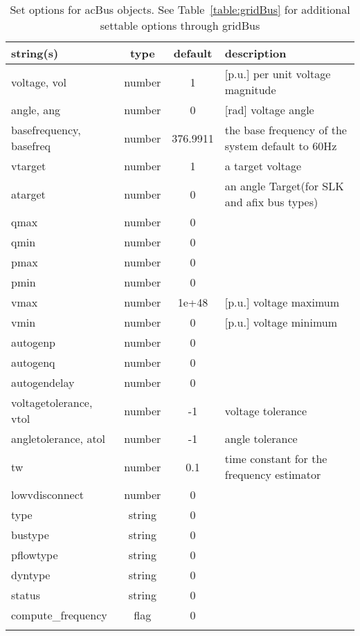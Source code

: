 \begin{longtable}{p{5cm} c c p{7cm}}
string(s) & type & default & description \\
\hline
voltage, vol & number & 1 & [p.u.]    per unit voltage magnitude\\
angle, ang & number & 0 & [rad]     voltage angle\\
basefrequency, basefreq & number & 376.9911 & the base frequency of the system default to 60Hz\\
vtarget & number & 1 & a target voltage\\
atarget & number & 0 & an angle Target(for SLK and afix bus types)\\
qmax & number & 0 & \\
qmin & number & 0 & \\
pmax & number & 0 & \\
pmin & number & 0 & \\
vmax & number & 1e+48 & [p.u.]    voltage maximum\\
vmin & number & 0 & [p.u.]    voltage minimum\\
autogenp & number & 0 & \\
autogenq & number & 0 & \\
autogendelay & number & 0 & \\
voltagetolerance, vtol & number & -1 & voltage tolerance\\
angletolerance, atol & number & -1 & angle tolerance\\
tw & number & 0.1 & time constant for the frequency estimator\\
lowvdisconnect & number & 0 & \\
type & string & 0 & \\
bustype & string & 0 & \\
pflowtype & string & 0 & \\
dyntype & string & 0 & \\
status & string & 0 & \\
compute\_frequency & flag & 0 & \\
\hline
\caption{Set options for acBus objects. See Table~\ref{table:gridBus} for additional settable options through gridBus}
\label{table:acBus}
\end{longtable}
